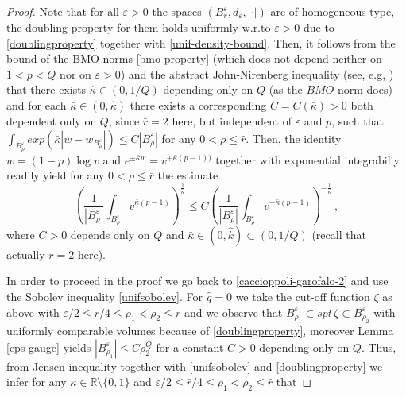 \documentclass[10pt]{amsart}
\numberwithin{equation}{section}
\theoremstyle{definition}
\begin{document}
\begin{proof}
Note that for all $\varepsilon>0$ the spaces $(B^\varepsilon_{\bar{r}}, d_\varepsilon, |\cdot|)$ are of homogeneous type, the doubling property for them holds uniformly w.r.to $\varepsilon>0$ due to \eqref{doublingproperty} together with \eqref{unif-density-bound}.  Then, it follows from the bound of the BMO norms \eqref{bmo-property} (which does not depend neither on $1<p<Q$ nor on $\varepsilon >0$) and the abstract John-Nirenberg inequality (see, e.g, \cite[Theorem 1]{Burger}) that there exists $\hat{\kappa} \in (0,1/Q)$ depending only on $Q$ (as the $BMO$ norm does) and for each $\bar{\kappa} \in (0,\hat{\kappa})$ there exists a corresponding $C=C(\bar{\kappa})>0$ both dependent only on  $Q$, since $\bar{r}=2$ here, but independent of $\varepsilon$ and $p$,  such that $\int_{B^\varepsilon_{\rho}} exp \left(\bar{\kappa} |w-   w_{B^\varepsilon_\rho}|  \right)\leq C |B^\varepsilon_\rho|$ for any $0<\rho\leq \bar{r}$. Then, the identity $w=(1-p)\log v$ and $e^{\pm \bar{\kappa} w}=v^{\mp \bar{\kappa}(p-1)) }$ together with exponential integrabiliy readily yield for any $0<\rho\leq \bar{r}$ the estimate
\begin{equation}
\label{muckenoupt}
\left( \frac{1}{|B^\varepsilon_\rho|} \int_{B^\varepsilon_\rho}v^{\bar{\kappa}(p-1)}\right)^{\frac1{\bar{\kappa}}} \leq C  \left( \frac{1}{|B^\varepsilon_\rho|} \int_{B^\varepsilon_\rho}v^{-\bar{\kappa}(p-1)}\right)^{-\frac1{\bar{\kappa}}} \, ,
\end{equation}
where $C>0$ depends  only on $Q$ and $\bar{\kappa} \in (0, \hat{k}) \subset (0,1/Q)$ (recall that actually $\bar{r}=2$ here).




In order to proceed in the proof we go back to \eqref{caccioppoli-garofalo-2} and use the Sobolev inequality \eqref{unifsobolev}. For $\hat{g}=0$ we take the cut-off function $\zeta$ as above with $\varepsilon/2 \leq  \bar{r}/4 \leq \rho_1 <\rho_2 \leq \bar{r}$ and we observe that $  B_{ \rho_1}^\varepsilon  \subset spt \, \zeta \subset B_{ \rho_2}^\varepsilon$ with uniformly comparable volumes because of  \eqref{doublingproperty}, moreover Lemma \ref{eps-gauge} yields $| B_{\rho_1}^\varepsilon |\leq C \rho_2^Q$ for a constant $C>0$ depending only on $Q$.
Thus, from Jensen inequality together with \eqref{unifsobolev} and \eqref{doublingproperty} we infer for any $\kappa \in \mathbb{R}\setminus\{ 0, 1\}$ and $\varepsilon/2 \leq \bar{r}/4 \leq \rho_1 <\rho_2 \leq \bar{r}$ that


\end{proof}
\end{document}
